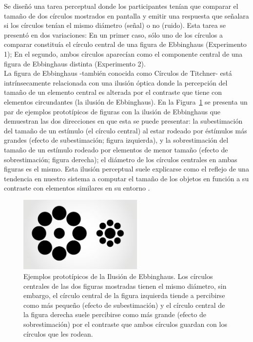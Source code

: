 Se diseñó una tarea perceptual donde los participantes tenían que comparar el tamaño de dos círculos mostrados en pantalla y emitir una respuesta que señalara si los círculos tenían el mismo diámetro (señal) o no (ruido). Esta tarea se presentó en dos variaciones: En un primer caso, sólo uno de los círculos a comparar constituía el círculo central de una figura de Ebbinghaus (Experimento 1); En el segundo, ambos círculos aparecían como el componente central de una figura de Ebbinghaus distinta (Experimento 2).\\ 

La figura de Ebbinghaus -también conocida como Círculos de Titchner- está intrínsecamente relacionada con una ilusión óptica donde la percepción del tamaño de un elemento central es alterada por el contraste que tiene con elementos circundantes (la ilusión de Ebbinghaus). En la Figura~\ref{fig:Ebbinghaus} se presenta un par de ejemplos prototípicos de figuras con la ilusión de Ebbinghaus que demuestran las dos direcciones en que esta se puede presentar: la subestimación del tamaño de un estímulo (el círculo central) al estar rodeado por éstímulos más grandes (efecto de subestimación; figura izquierda), y la sobrestimación del tamaño de un estímulo rodeado por elementos de menor tamaño (efecto de sobrestimación; figura derecha); el diámetro de los círculos centrales en ambas figuras es el mismo. Esta ilusión perceptual suele explicarse como el reflejo de una tendencia en nuestro sistema a computar el tamaño de los objetos en función a su contraste con elementos similares en su entorno \parencite{Coren1971, Coren1974, Fockert2007}.\\

\begin{figure}[th]
\centering
\includegraphics[width=0.55\textwidth]{Figures/Ebbinghaus} 
\decoRule
\caption[Ilusión de Ebbinghaus: Ejemplos]{Ejemplos prototípicos de la Ilusión de Ebbinghaus. Los círculos centrales de las dos figuras mostradas tienen el mismo diámetro, sin embargo, el círculo central de la figura izquierda tiende a percibirse como más pequeño (efecto de subestimación) y el círculo central de la figura derecha suele percibirse como más grande (efecto de sobrestimación) por el contraste que ambos círculos guardan con los círculos que les rodean.}
\label{fig:Ebbinghaus}
\end{figure}


